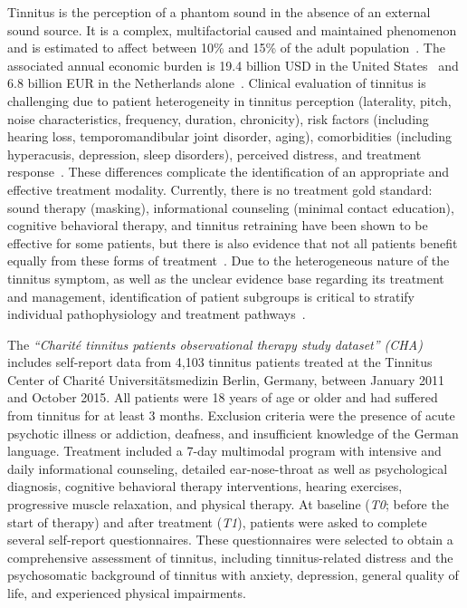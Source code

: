 \documentclass[
  oneside]{book}
\begin{document}
Tinnitus is the perception of a phantom sound in the absence of an external sound source.
It is a complex, multifactorial caused and maintained phenomenon and is estimated to affect between 10\% and 15\% of the adult population~\autocite{Baguley:Tinnitus2013}.
The associated annual economic burden is 19.4 billion USD in the
United States~\autocite{Bhatt:TinnitusAnxietyDepression2017} and 6.8 billion EUR in the Netherlands alone~\autocite{Maes:TinnitusCosts2013}.
Clinical evaluation of tinnitus is challenging due to patient heterogeneity in tinnitus perception (laterality, pitch, noise characteristics, frequency, duration, chronicity), risk factors (including hearing loss, temporomandibular joint disorder, aging), comorbidities (including hyperacusis, depression, sleep disorders), perceived distress, and treatment response~\autocite{Cederroth2019}.
These differences complicate the identification of an appropriate and effective treatment modality.
Currently, there is no treatment gold standard: sound therapy (masking), informational counseling (minimal contact education), cognitive behavioral therapy, and tinnitus retraining have been shown to be effective for some patients, but there is also evidence that not all patients benefit equally from these forms of treatment~\autocite{Hobson:SoundTherapy2012,Kroner:Counseling2003,Henry:Counseling1996,Martinez:CBTReview2007,Phillips:TRT2010}.
Due to the heterogeneous nature of the tinnitus symptom, as well as the unclear evidence base regarding its treatment and management, identification of patient subgroups is critical to stratify individual pathophysiology and treatment pathways~\autocite{Langguth:LCA2017,Tyler:TinnitusClustering2008,Landgrebe:TRI2010}.

The \emph{``Charité tinnitus patients observational therapy study dataset'' (CHA)} includes self-report data from 4,103 tinnitus patients treated at the Tinnitus Center of Charité Universitätsmedizin Berlin, Germany, between January 2011 and October 2015.
All patients were 18 years of age or older and had suffered from tinnitus for at least 3 months.
Exclusion criteria were the presence of acute psychotic illness or addiction, deafness, and insufficient knowledge of the German language.
Treatment included a 7-day multimodal program with intensive and daily informational counseling, detailed ear-nose-throat as well as psychological diagnosis, cognitive behavioral therapy interventions, hearing exercises, progressive muscle relaxation, and physical therapy.
At baseline (\emph{T0}; before the start of therapy) and after treatment (\emph{T1}), patients were asked to complete several self-report questionnaires.
These questionnaires were selected to obtain a comprehensive assessment of tinnitus, including tinnitus-related distress and the psychosomatic background of tinnitus with anxiety, depression, general quality of life, and experienced physical impairments.
\end{document}
